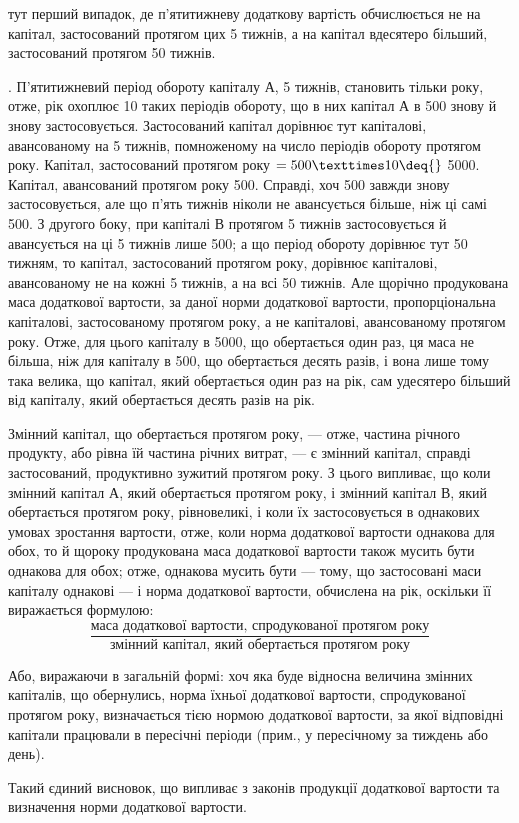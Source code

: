 \parcont{}  %
тут перший випадок, де п’ятитижневу додаткову вартість обчислюється
не на капітал, застосований протягом цих 5 тижнів, а на капітал вдесятеро
більший, застосований протягом 50 тижнів.

. П’ятитижневий період обороту капіталу $А$, 5 тижнів,
становить тільки  року, отже, рік охоплює 10 таких періодів обороту,
що в них капітал $А$ в 500 знову й знову застосовується.
Застосований капітал дорівнює тут капіталові, авансованому на 5 тижнів,
помноженому на число періодів обороту протягом року. Капітал, застосований
протягом року $= 500 × 10 \deq{}$ 5000. Капітал, авансований
протягом року \deq{}  \deq{} 500. Справді, хоч 500 завжди
знову застосовується, але що п’ять тижнів ніколи не авансується більше,
ніж ці самі 500. З другого боку, при капіталі $В$ протягом 5 тижнів
застосовується й авансується на ці 5 тижнів лише 500; а що
період обороту дорівнює тут 50 тижням, то капітал, застосований протягом
року, дорівнює капіталові, авансованому не на кожні 5 тижнів, а на
всі 50 тижнів. Але щорічно продукована маса додаткової вартости, за
даної норми додаткової вартости, пропорціональна капіталові, застосованому
протягом року, а не капіталові, авансованому протягом року. Отже, для
цього капіталу в 5000, що обертається один раз, ця маса не
більша, ніж для капіталу в 500, що обертається десять разів, і
вона лише тому така велика, що капітал, який обертається один раз на
рік, сам удесятеро більший від капіталу, який обертається десять разів
на рік.

Змінний капітал, що обертається протягом року, — отже, частина річного
продукту, або рівна їй частина річних витрат, — є змінний капітал,
справді застосований, продуктивно зужитий протягом року. З цього випливає,
що коли змінний капітал $А$, який обертається протягом року, і
змінний капітал $В$, який обертається протягом року, рівновеликі, і коли
їх застосовується в однакових умовах зростання вартости, отже, коли норма
додаткової вартости однакова для обох, то й щороку продукована
маса додаткової вартости також мусить бути однакова для обох; отже,
однакова мусить бути — тому, що застосовані маси капіталу однакові — і
норма додаткової вартости, обчислена на рік, оскільки її виражається
формулою:\[
\frac{\text{маса додаткової вартости, спродукованої протягом року}}{\text{змінний капітал, який обертається протягом
року}}
\]

Або, виражаючи в загальній формі: хоч яка буде відносна величина
змінних капіталів, що обернулись, норма їхньої додаткової вартости,
спродукованої протягом року, визначається тією нормою додаткової вартости,
за якої відповідні капітали працювали в пересічні періоди (прим.,
у пересічному за тиждень або день).

Такий єдиний висновок, що випливає з законів продукції додаткової
вартости та визначення норми додаткової вартости.
